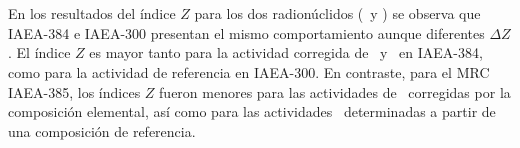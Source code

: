 \\ \\ 
En los resultados del índice $Z$ para los dos radionúclidos (\PbCero\, y \PbCuatro) se observa que IAEA-384 e IAEA-300 presentan el mismo comportamiento aunque diferentes $\Delta Z$. El índice $Z$ es mayor tanto para la actividad corregida de \PbCero\, y \PbCuatro\, en IAEA-384, como para la actividad de referencia en IAEA-300. En contraste, para el MRC IAEA-385, los índices $Z$ fueron menores para las actividades de \PbCero\, corregidas por la composición elemental, así como para las actividades \PbCuatro\, determinadas a partir de una composición de referencia.